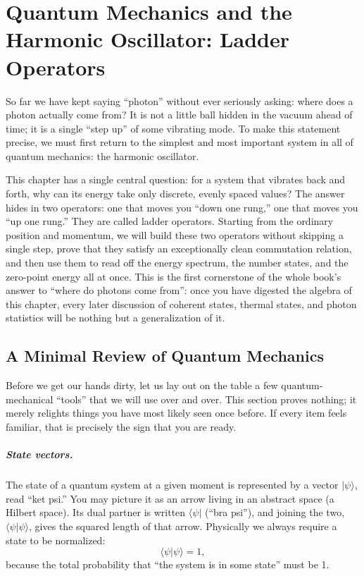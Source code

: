 \chapter{Quantum Mechanics and the Harmonic Oscillator: Ladder Operators}
\label{chap:e04}

\begin{chapteropening}
So far we have kept saying ``photon'' without ever seriously asking: where does a photon actually come from? It is not a little ball hidden in the vacuum ahead of time; it is a single ``step up'' of some vibrating mode. To make this statement precise, we must first return to the simplest and most important system in all of quantum mechanics: the harmonic oscillator.

This chapter has a single central question: for a system that vibrates back and forth, why can its energy take only discrete, evenly spaced values? The answer hides in two operators: one that moves you ``down one rung,'' one that moves you ``up one rung.'' They are called ladder operators. Starting from the ordinary position and momentum, we will build these two operators without skipping a single step, prove that they satisfy an exceptionally clean commutation relation, and then use them to read off the energy spectrum, the number states, and the zero-point energy all at once. This is the first cornerstone of the whole book's answer to ``where do photons come from'': once you have digested the algebra of this chapter, every later discussion of coherent states, thermal states, and photon statistics will be nothing but a generalization of it.
\end{chapteropening}

\section{A Minimal Review of Quantum Mechanics}
\label{sec:e04-review}

Before we get our hands dirty, let us lay out on the table a few quantum-mechanical ``tools'' that we will use over and over. This section proves nothing; it merely relights things you have most likely seen once before. If every item feels familiar, that is precisely the sign that you are ready.

\paragraph{State vectors.}
The state of a quantum system at a given moment is represented by a vector \(|\psi\rangle\), read ``ket psi.'' You may picture it as an arrow living in an abstract space (a Hilbert space). Its dual partner is written \(\langle\psi|\) (``bra psi''), and joining the two, \(\langle\psi|\psi\rangle\), gives the squared length of that arrow. Physically we always require a state to be normalized:
\[
  \langle\psi|\psi\rangle=1,
\]
because the total probability that ``the system is in some state'' must be 1.

